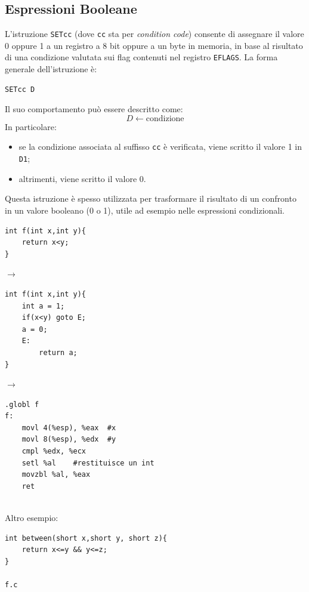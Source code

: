 \subsection{Espressioni Booleane}
L'istruzione \texttt{SETcc} (dove \texttt{cc} sta per \textit{condition code}) consente di assegnare il valore 0 oppure 1 a un registro a 8 bit oppure a un byte in memoria, in base al risultato di una condizione valutata sui flag contenuti nel registro \texttt{EFLAGS}. La forma generale dell'istruzione è:
\begin{verbatim}
SETcc D
\end{verbatim}
\noindent Il suo comportamento può essere descritto come:
\[
D \leftarrow \text{condizione}
\]
In particolare:
\begin{itemize}
    \item se la condizione associata al suffisso \texttt{cc} è verificata, viene scritto il valore 1 in \texttt{D1};
    \item altrimenti, viene scritto il valore 0.
\end{itemize}
Questa istruzione è spesso utilizzata per trasformare il risultato di un confronto in un valore booleano (0 o 1), utile ad esempio nelle espressioni condizionali. \medskip\\
\begin{minipage}{0.3\textwidth}
    \begin{verbatim}
int f(int x,int y){
    return x<y;
}
    \end{verbatim}
\end{minipage}
\hfill
$\longrightarrow$
\hfill
\begin{minipage}{0.3\textwidth}
    \begin{verbatim}
int f(int x,int y){
    int a = 1;
    if(x<y) goto E;
    a = 0;
    E:
        return a;
}
    \end{verbatim}
\end{minipage}
\hfill
$\longrightarrow$
\hfill
\begin{minipage}{0.3\textwidth}
    \begin{verbatim}
.globl f
f:
    movl 4(%esp), %eax  #x
    movl 8(%esp), %edx  #y
    cmpl %edx, %ecx
    setl %al    #restituisce un int
    movzbl %al, %eax
    ret
    \end{verbatim} 
\end{minipage}\medskip\\
\noindent Altro esempio: \medskip\\
\begin{minipage}{0.4\textwidth}
    \begin{verbatim}
int between(short x,short y, short z){
    return x<=y && y<=z;
}

f.c
    \end{verbatim}
\end{minipage}
